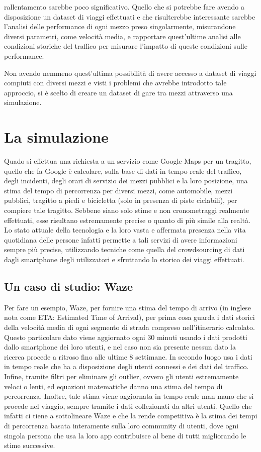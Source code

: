 rallentamento sarebbe poco significativo. Quello che si potrebbe fare avendo a disposizione un dataset di viaggi effettuati e che risulterebbe interessante sarebbe l'analisi delle performance di ogni mezzo preso singolarmente, misurandone diversi parametri, come velocità media, e rapportare quest'ultime analisi alle condizioni storiche del traffico per misurare l'impatto di queste condizioni sulle performance.

Non avendo nemmeno quest'ultima possibilità di avere accesso a dataset di viaggi compiuti con diversi mezzi e visti i problemi che avrebbe introdotto tale approccio, si è scelto di creare un dataset di gare tra mezzi attraverso una simulazione.

\section{La simulazione}

Quado si effettua una richiesta a un servizio come Google Maps per un tragitto, quello che fa Google è calcolare, sulla base di dati in tempo reale del traffico, degli incidenti, degli orari di servizio dei mezzi pubblici e la loro posizione, una stima del tempo di percorrenza per diversi mezzi, come automobile, mezzi pubblici, tragitto a piedi e bicicletta (solo in presenza di piste ciclabili), per compiere tale tragitto. Sebbene siano solo stime e non cronometraggi realmente effettuati, esse risultano estremamente precise o quanto di più simile alla realtà. Lo stato attuale della tecnologia e la loro vasta e affermata presenza nella vita quotidiana delle persone infatti permette a tali servizi di avere informazioni sempre più precise, utilizzando tecniche come quella del crowdsourcing di dati dagli smartphone degli utilizzatori e sfruttando lo storico dei viaggi effettuati. 

\subsection{Un caso di studio: Waze}

Per fare un esempio, Waze, per fornire una stima del tempo di arrivo (in inglese nota come ETA: Estimated Time of Arrival), per prima cosa guarda i dati storici della velocità media di ogni segmento di strada compreso nell'itinerario calcolato. Questo particolare dato viene aggiornato ogni 30 minuti usando i dati prodotti dallo smartphone dei loro utenti, e nel caso non sia presente nessun dato la ricerca procede a ritroso fino alle ultime 8 settimane. In secondo luogo usa i dati in tempo reale che ha a disposizione degli utenti connessi e dei dati del traffico. Infine, tramite filtri per eliminare gli outlier, ovvero gli utenti estremamente veloci o lenti, ed equazioni matematiche danno una stima del tempo di percorrenza. Inoltre, tale stima viene aggiornata in tempo reale man mano che si procede nel viaggio, sempre tramite i dati collezionati da altri utenti. Quello che infatti ci tiene a sottolineare Waze e che la rende competitiva è la stima dei tempi di percorrenza basata interamente sulla loro community di utenti, dove ogni singola persona che usa la loro app contribuisce al bene di tutti migliorando le stime successive\cite{wazeblog}.
